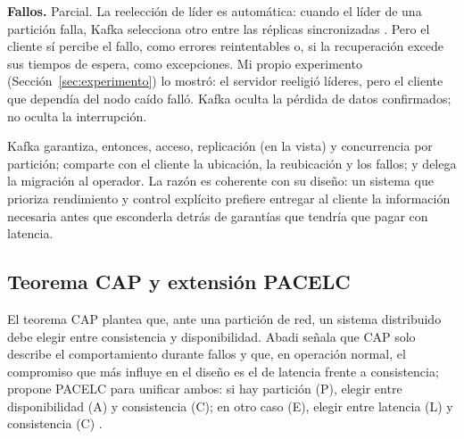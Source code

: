 \documentclass[11pt,a4paper]{article}
\begin{document}
\textbf{Fallos.} Parcial. La reelección de líder es automática: cuando el líder de una partición falla, Kafka selecciona otro entre las réplicas sincronizadas \cite{zhou2024distributed}. Pero el cliente sí percibe el fallo, como errores reintentables o, si la recuperación excede sus tiempos de espera, como excepciones. Mi propio experimento (Sección~\ref{sec:experimento}) lo mostró: el servidor reeligió líderes, pero el cliente que dependía del nodo caído falló. Kafka oculta la pérdida de datos confirmados; no oculta la interrupción.

Kafka garantiza, entonces, acceso, replicación (en la vista) y concurrencia por partición; comparte con el cliente la ubicación, la reubicación y los fallos; y delega la migración al operador. La razón es coherente con su diseño: un sistema que prioriza rendimiento y control explícito prefiere entregar al cliente la información necesaria antes que esconderla detrás de garantías que tendría que pagar con latencia.

\subsection{Teorema CAP y extensión PACELC}
\label{sec:cap}

El teorema CAP plantea que, ante una partición de red, un sistema distribuido debe elegir entre consistencia y disponibilidad. Abadi señala que CAP solo describe el comportamiento durante fallos y que, en operación normal, el compromiso que más influye en el diseño es el de latencia frente a consistencia; propone PACELC para unificar ambos: si hay partición (P), elegir entre disponibilidad (A) y consistencia (C); en otro caso (E), elegir entre latencia (L) y consistencia (C) \cite{abadi2012consistency}.
\end{document}
